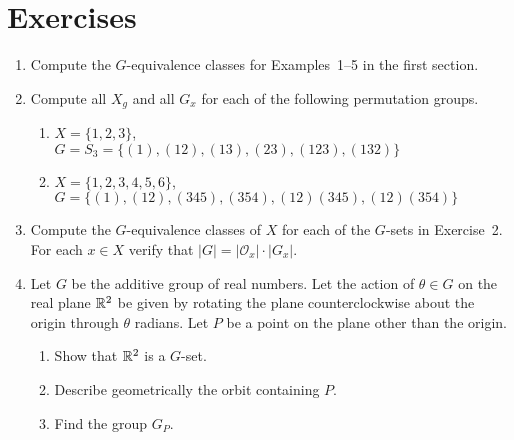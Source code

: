  
 
\section*{Exercises}
\exrule
 
 
 
 
{\small
\begin{enumerate}
 
 
\bf\item\rm
Compute the $G$-equivalence classes for Examples~1--5  in the first
section. 
 
 
\bf\item\rm 
Compute all $X_g$ and all $G_x$ for each of the following permutation
groups. 
\begin{enumerate}
 
 \bf\item\rm
$X= \{1, 2, 3\}$, \\
$G=S_3=\{(1), (12), (13), (23), (123), (132)  \}$
 
 \bf\item\rm
$X = \{1, 2, 3, 4, 5, 6\}$, \\
$G = \{(1), (12), (345), (354), (12)(345), (12)(354)  \}$
 
\end{enumerate}
 
 
\bf\item\rm
Compute the $G$-equivalence classes of $X$ for each of the $G$-sets in
Exercise~2. For each $x \in X$ verify that $|G|=|{\mathcal O}_x| \cdot
|G_x|$.  
 
 
\bf\item\rm
Let $G$ be the additive group of real numbers. Let the action of
$\theta \in G$ on the real plane ${\Bbb R}^2$ be given by rotating the
plane counterclockwise about the origin through $\theta$ radians. Let
$P$ be a point on the plane other than the origin.
\begin{enumerate}
 
 \bf\item\rm
Show that ${\Bbb R}^2$ is a $G$-set.
 
 \bf\item\rm
Describe geometrically the orbit containing $P$.
 
 \bf\item\rm
Find the group $G_P$.
 
\end{enumerate}
 

\end{enumerate}}
